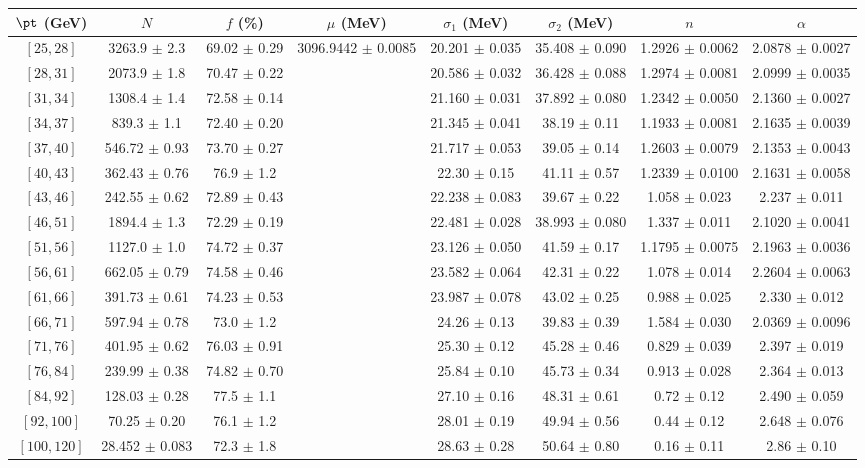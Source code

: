 \begin{tabular}{c||c|c|c|c|c|c|c}
$\pt$ (GeV) & $N$ & $f$ (\%) & $\mu$ (MeV) & $\sigma_1$ (MeV) & $\sigma_2$ (MeV) & $n$ & $\alpha$ \\
\hline
$[25, 28]$ & 3263.9 $\pm$ 2.3 & 69.02 $\pm$ 0.29 & \multirow{17}{*}{3096.9442 $\pm$ 0.0085} & 20.201 $\pm$ 0.035 & 35.408 $\pm$ 0.090 & 1.2926 $\pm$ 0.0062 & 2.0878 $\pm$ 0.0027\\
$[28, 31]$ & 2073.9 $\pm$ 1.8 & 70.47 $\pm$ 0.22 &  & 20.586 $\pm$ 0.032 & 36.428 $\pm$ 0.088 & 1.2974 $\pm$ 0.0081 & 2.0999 $\pm$ 0.0035\\
$[31, 34]$ & 1308.4 $\pm$ 1.4 & 72.58 $\pm$ 0.14 &  & 21.160 $\pm$ 0.031 & 37.892 $\pm$ 0.080 & 1.2342 $\pm$ 0.0050 & 2.1360 $\pm$ 0.0027\\
$[34, 37]$ & 839.3 $\pm$ 1.1 & 72.40 $\pm$ 0.20 &  & 21.345 $\pm$ 0.041 & 38.19 $\pm$ 0.11 & 1.1933 $\pm$ 0.0081 & 2.1635 $\pm$ 0.0039\\
$[37, 40]$ & 546.72 $\pm$ 0.93 & 73.70 $\pm$ 0.27 &  & 21.717 $\pm$ 0.053 & 39.05 $\pm$ 0.14 & 1.2603 $\pm$ 0.0079 & 2.1353 $\pm$ 0.0043\\
$[40, 43]$ & 362.43 $\pm$ 0.76 & 76.9 $\pm$ 1.2 &  & 22.30 $\pm$ 0.15 & 41.11 $\pm$ 0.57 & 1.2339 $\pm$ 0.0100 & 2.1631 $\pm$ 0.0058\\
$[43, 46]$ & 242.55 $\pm$ 0.62 & 72.89 $\pm$ 0.43 &  & 22.238 $\pm$ 0.083 & 39.67 $\pm$ 0.22 & 1.058 $\pm$ 0.023 & 2.237 $\pm$ 0.011\\
$[46, 51]$ & 1894.4 $\pm$ 1.3 & 72.29 $\pm$ 0.19 &  & 22.481 $\pm$ 0.028 & 38.993 $\pm$ 0.080 & 1.337 $\pm$ 0.011 & 2.1020 $\pm$ 0.0041\\
$[51, 56]$ & 1127.0 $\pm$ 1.0 & 74.72 $\pm$ 0.37 &  & 23.126 $\pm$ 0.050 & 41.59 $\pm$ 0.17 & 1.1795 $\pm$ 0.0075 & 2.1963 $\pm$ 0.0036\\
$[56, 61]$ & 662.05 $\pm$ 0.79 & 74.58 $\pm$ 0.46 &  & 23.582 $\pm$ 0.064 & 42.31 $\pm$ 0.22 & 1.078 $\pm$ 0.014 & 2.2604 $\pm$ 0.0063\\
$[61, 66]$ & 391.73 $\pm$ 0.61 & 74.23 $\pm$ 0.53 &  & 23.987 $\pm$ 0.078 & 43.02 $\pm$ 0.25 & 0.988 $\pm$ 0.025 & 2.330 $\pm$ 0.012\\
$[66, 71]$ & 597.94 $\pm$ 0.78 & 73.0 $\pm$ 1.2 &  & 24.26 $\pm$ 0.13 & 39.83 $\pm$ 0.39 & 1.584 $\pm$ 0.030 & 2.0369 $\pm$ 0.0096\\
$[71, 76]$ & 401.95 $\pm$ 0.62 & 76.03 $\pm$ 0.91 &  & 25.30 $\pm$ 0.12 & 45.28 $\pm$ 0.46 & 0.829 $\pm$ 0.039 & 2.397 $\pm$ 0.019\\
$[76, 84]$ & 239.99 $\pm$ 0.38 & 74.82 $\pm$ 0.70 &  & 25.84 $\pm$ 0.10 & 45.73 $\pm$ 0.34 & 0.913 $\pm$ 0.028 & 2.364 $\pm$ 0.013\\
$[84, 92]$ & 128.03 $\pm$ 0.28 & 77.5 $\pm$ 1.1 &  & 27.10 $\pm$ 0.16 & 48.31 $\pm$ 0.61 & 0.72 $\pm$ 0.12 & 2.490 $\pm$ 0.059\\
$[92, 100]$ & 70.25 $\pm$ 0.20 & 76.1 $\pm$ 1.2 &  & 28.01 $\pm$ 0.19 & 49.94 $\pm$ 0.56 & 0.44 $\pm$ 0.12 & 2.648 $\pm$ 0.076\\
$[100, 120]$ & 28.452 $\pm$ 0.083 & 72.3 $\pm$ 1.8 &  & 28.63 $\pm$ 0.28 & 50.64 $\pm$ 0.80 & 0.16 $\pm$ 0.11 & 2.86 $\pm$ 0.10\\
\end{tabular}
